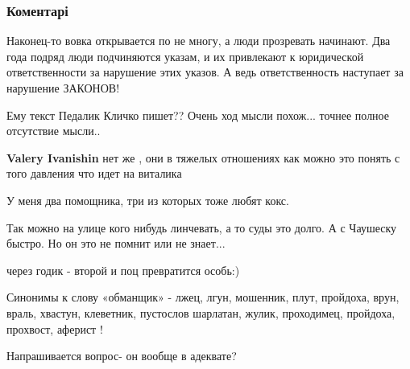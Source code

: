  
 
 
 
 
\subsubsection{Коментарі}
\label{sec:26_11_2021.fb.medvedeva_olesja.2.prezident_ludi.cmt}

\begin{itemize} %

Наконец-то вовка открывается по не многу, а люди прозревать начинают. Два года
подряд люди подчиняются указам, и их привлекают к юридической ответственности
за нарушение этих указов. А ведь ответственность наступает за нарушение
ЗАКОНОВ!


Ему текст Педалик Кличко пишет?? Очень ход мысли похож... точнее полное
отсутствие мысли..

\begin{itemize} %
\textbf{Valery Ivanishin} нет же , они в тяжелых отношениях как можно это понять с того давления что идет на виталика
\end{itemize} %


У меня два помощника, три из которых тоже любят кокс.


Так можно на улице кого нибудь линчевать, а то суды это долго. А с Чаушеску
быстро. Но он это не помнит или не знает...

через годик - второй и поц превратится особь:)


Синонимы к слову «обманщик» - лжец, лгун, мошенник, плут, пройдоха, врун,
враль, хвастун, клеветник, пустослов шарлатан, жулик, проходимец, пройдоха,
прохвост, аферист !


Напрашивается вопрос- он вообще в адеквате?



\end{itemize}
